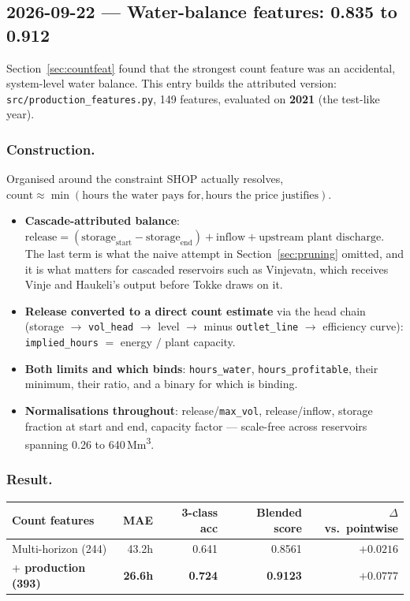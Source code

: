 \subsection{2026-09-22 --- Water-balance features: 0.835 to 0.912}
\label{sec:production}

Section~\ref{sec:countfeat} found that the strongest count feature was an accidental,
system-level water balance. This entry builds the attributed version:
\texttt{src/production\_features.py}, 149 features, evaluated on \textbf{2021} (the test-like
year).

\subsubsection*{Construction.} Organised around the constraint SHOP actually resolves,
$\text{count} \approx \min(\text{hours the water pays for}, \text{hours the price justifies})$.

\begin{itemize}\itemsep1pt
  \item \textbf{Cascade-attributed balance}: $\text{release} = (\text{storage}_{\text{start}} -
        \text{storage}_{\text{end}}) + \text{inflow} + \text{upstream plant discharge}$. The last
        term is what the naive attempt in Section~\ref{sec:pruning} omitted, and it is what matters
        for cascaded reservoirs such as Vinjevatn, which receives Vinje and Haukeli's output before
        Tokke draws on it.
  \item \textbf{Release converted to a direct count estimate} via the head chain (storage $\to$
        \texttt{vol\_head} $\to$ level $\to$ minus \texttt{outlet\_line} $\to$ efficiency curve):
        \texttt{implied\_hours} $=$ energy $/$ plant capacity.
  \item \textbf{Both limits and which binds}: \texttt{hours\_water}, \texttt{hours\_profitable},
        their minimum, their ratio, and a binary for which is binding.
  \item \textbf{Normalisations throughout}: release/\texttt{max\_vol}, release/inflow, storage
        fraction at start and end, capacity factor --- scale-free across reservoirs spanning
        0.26 to 640\,Mm\textsuperscript{3}.
\end{itemize}

\subsubsection*{Result.}

\begin{center}
\begin{tabular}{lrrrr}
\toprule
Count features & MAE & 3-class acc & Blended score & $\Delta$ vs.\ pointwise \\
\midrule
Multi-horizon (244)            & 43.2h & 0.641 & 0.8561 & $+0.0216$ \\
\textbf{$+$ production (393)}  & \textbf{26.6h} & \textbf{0.724} & \textbf{0.9123} & $\mathbf{+0.0777}$ \\
\bottomrule
\end{tabular}
\end{center}

